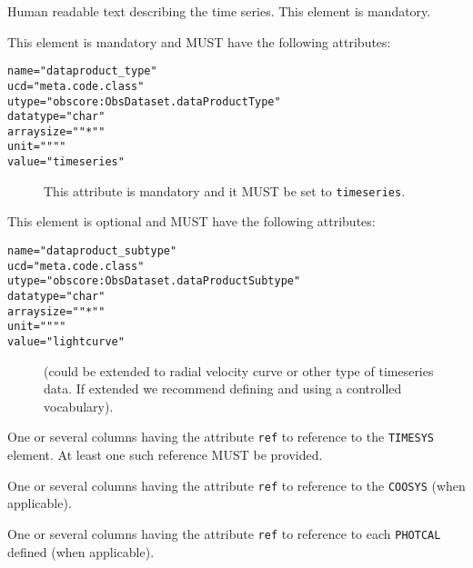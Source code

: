 \documentclass[11pt,a4paper]{ivoa}
\let\fg=\color
\def\attr#1{{\tt{\fg{DarkRed}#1}}}
\def\elem#1{{\tt{\fg{DarkRed}#1}}}
\def\attrval#1#2{{\tt{\fg{DarkRed}#1}="{\fg{DarkPurple}#2}"}}
\begin{document}
\begin{description}
     \item[\attr{DESCRIPTION}] Human readable text describing the time series. This element is mandatory. 
     \item[\elem{PARAM}] This element is mandatory and MUST have the following attributes:
     \begin{description}
        \item[\attrval{name}{dataproduct\_type}]
        \item[\attrval{ucd}{meta.code.class}]
        \item[\attrval{utype}{obscore:ObsDataset.dataProductType}] 
        \item[\attrval{datatype}{char}]
         \item[\attrval{arraysize}{"*"}]
       \item[\attrval{unit}{""}]
        \item[\attrval{value}{timeseries}] This attribute is mandatory and it MUST be set to \verb|timeseries|. 
     \end{description}
     \item[\elem{PARAM}] This element is optional and MUST have the following attributes:  
     \begin{description}
        \item[\attrval{name}{dataproduct\_subtype}]
        \item[\attrval{ucd}{meta.code.class}]
        \item[\attrval{utype}{obscore:ObsDataset.dataProductSubtype}] 
        \item[\attrval{datatype}{char}]
        \item[\attrval{arraysize}{"*"}]
        \item[\attrval{unit}{""}]
        \item[\attrval{value}{lightcurve}] (could be extended to radial velocity curve or other type of timeseries data. If extended we recommend defining and using a controlled vocabulary). 
     \end{description}
     \item One or several columns having the attribute \elem{ref} to reference to the \elem{TIMESYS} element. At least one such reference MUST be provided.
     \item One or several columns having the attribute \elem{ref} to reference to the \elem{COOSYS} (when applicable). 
     \item One or several columns having the attribute \elem{ref} to reference to each \elem{PHOTCAL} defined (when applicable). 
\end{description}
\end{document}
